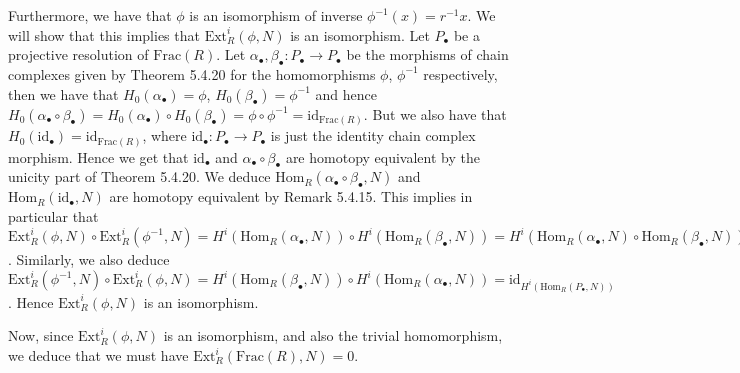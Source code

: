 \documentclass{article}
\newcommand{\Frac}{\mathrm{Frac}}
\newcommand{\Hom}[2]{\mathrm{Hom}_R(#1, #2)}
\newcommand{\Ext}{\mathrm{Ext}_R}
\newcommand{\id}{\mathrm{id}}
\begin{document}
Furthermore, we have that $\phi$ is an isomorphism of inverse
$\phi^{-1}(x) = r^{-1}x$. We will show that this implies that
$\Ext^i(\phi, N)$ is an isomorphism.
Let $P_\bullet$ be a projective resolution of $\Frac(R)$.
Let $\alpha_\bullet, \beta_\bullet: P_\bullet \to P_\bullet$ be the
morphisms of chain complexes given by Theorem 5.4.20 for the
homomorphisms $\phi$, $\phi^{-1}$ respectively, then
we have that $H_0(\alpha_\bullet) = \phi$, 
$H_0(\beta_\bullet) = \phi^{-1}$
and hence $H_0(\alpha_\bullet \circ \beta_\bullet) = 
H_0(\alpha_\bullet) \circ H_0(\beta_\bullet) = \phi \circ \phi^{-1}
= \id_{\Frac(R)}$.
But we also have that $H_0(\id_\bullet) = \id_{\Frac(R)}$, where
$\id_\bullet: P_\bullet \to P_\bullet$ is just the identity
chain complex morphism.
Hence we get that $\id_\bullet$ and
$\alpha_\bullet \circ \beta_\bullet$ are homotopy equivalent
by the unicity part of Theorem 5.4.20.
We deduce $\Hom{\alpha_\bullet\circ\beta_\bullet}{N}$ and
$\Hom{\id_\bullet}{N}$ are homotopy equivalent by Remark 5.4.15.
This implies in particular that
$\Ext^i(\phi, N)\circ \Ext^i(\phi^{-1}, N) = 
H^i(\Hom{\alpha_\bullet}{N}) \circ H^i(\Hom{\beta_\bullet}{N})
= H^i(\Hom{\alpha_\bullet}{N}\circ \Hom{\beta_\bullet}{N})
= H^i(\Hom{\alpha_\bullet \circ \beta_\bullet}{N})
= H^i(\Hom{\id_\bullet}{N}) = H^i(\id_{\Hom{P_\bullet}{N}})
= \id_{H^i(\Hom{P_\bullet}{N})}$.
Similarly, we also deduce
$\Ext^i(\phi^{-1}, N)\circ \Ext^i(\phi, N) = 
H^i(\Hom{\beta_\bullet}{N}) \circ H^i(\Hom{\alpha_\bullet}{N})
= \id_{H^i(\Hom{P_\bullet}{N})}$.
Hence $\Ext^i(\phi, N)$ is an isomorphism.

Now, since $\Ext^i(\phi, N)$ is an isomorphism, and also the
trivial homomorphism, we deduce that we must have
$\Ext^i(\Frac(R), N) = 0$.
\end{document}
